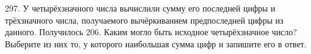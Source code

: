 297. У четырёхзначного числа вычислили сумму его последней цифры и трёхзначного числа, получаемого вычёркиванием предпоследней цифры из данного. Получилось 206. Каким могло быть исходное четырёхзначное число? Выберите из них то, у которого наибольшая сумма цифр и запишите его в ответ.\\
